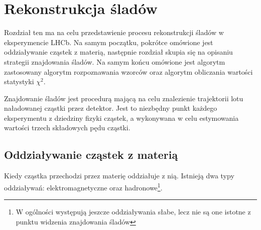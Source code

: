 \chapter{Rekonstrukcja śladów}

Rozdział ten ma na celu przedstawienie procesu rekonstrukcji śladów w eksperymencie LHCb. Na samym początku, pokrótce omówione jest oddziaływanie cząstek z materią, następnie rozdział skupia się na opisaniu strategii znajdowania śladów. Na samym końcu omówione jest algorytm zastosowany algorytm rozpoznawania wzorców oraz algorytm obliczania wartości statystyki $\chi^2$. 

Znajdowanie śladów jest procedurą mającą na celu znalezienie trajektorii lotu naładowanej cząstki przez detektor. Jest to niezbędny punkt każdego eksperymentu z dziedziny fizyki cząstek, a wykonywana w celu estymowania wartości trzech składowych pędu cząstki. 

\section{Oddziaływanie cząstek z materią}
Kiedy cząstka przechodzi przez materię oddziałuje z nią. Istnieją dwa typy oddziaływań: elektromagnetyczne oraz hadronowe\footnote{W ogólności występują jeszcze oddziaływania słabe, lecz nie są one istotne z punktu widzenia znajdowania śladów}. 

